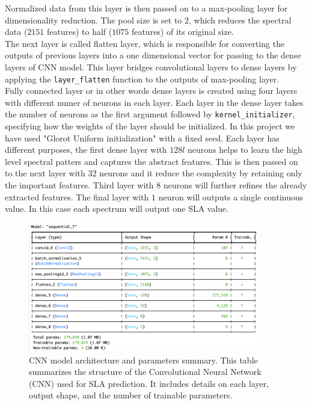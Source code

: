 \documentclass[12pt,a4paper]{report}
\begin{document}
Normalized data from this layer is then passed on to a max-pooling layer for dimensionality reduction. The pool size is set to $2$, which reduces the spectral data ($2151$ features) to half ($1075$ features) of its original size. \\

The next layer is called flatten layer, which is responsible for converting the outputs of previous layers into a one dimensional vector for passing to the dense layers of CNN model. This layer bridges convolutional layers to dense layers by applying the \texttt{layer\_flatten} function to the outputs of max-pooling layer. \\

Fully connected layer or in other words dense layers is created using four layers with different numer of neurons in each layer. Each layer in the dense layer takes the number of neurons as the first argument followed by \texttt{kernel\_initializer}, specifying how the weights of the layer should be initialized. In this project we have used "Glorot Uniform initialization" with a fixed seed. Each layer has different purposes, the first dense layer with $128l$ neurons helps to learn the high level spectral patters and captures the abstract features. This is then passed on to the next layer with $32$ neurons and it reduce the complexity by retaining only the important features. Third layer with $8$ neurons will further refines the already extracted features. The final layer with $1$ neuron will outputs a single continuous value. In this case each spectrum will output one SLA value.\\

\begin{figure}[h]
    \centering
    \includegraphics[width=0.9\textwidth]{Figures/cnn_model.png}
    \caption{CNN model architecture and parameters summary. This table summarizes the structure of the Convolutional Neural Network (CNN) used for SLA prediction. It includes details on each layer, output shape, and the number of trainable parameters.}
    \label{fig:cnn_model}
\end{figure}
\end{document}
